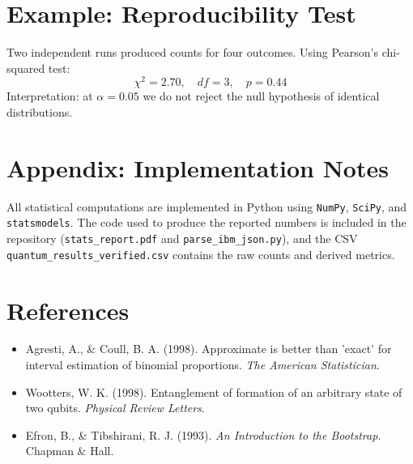 \documentclass[11pt]{article}
\begin{document}
\section{Example: Reproducibility Test}
Two independent runs produced counts for four outcomes. Using Pearson's chi-squared test:
\[
\chi^2 = 2.70,\quad df=3,\quad p=0.44
\]
Interpretation: at $\alpha=0.05$ we do not reject the null hypothesis of identical distributions.

\section{Appendix: Implementation Notes}
All statistical computations are implemented in Python using \texttt{NumPy}, \texttt{SciPy}, and \texttt{statsmodels}. The code used to produce the reported numbers is included in the repository (\texttt{stats\_report.pdf} and \texttt{parse\_ibm\_json.py}), and the CSV \texttt{quantum\_results\_verified.csv} contains the raw counts and derived metrics.

\section*{References}
\begin{itemize}
  \item Agresti, A., \& Coull, B. A. (1998). Approximate is better than 'exact' for interval estimation of binomial proportions. \emph{The American Statistician}.
  \item Wootters, W. K. (1998). Entanglement of formation of an arbitrary state of two qubits. \emph{Physical Review Letters}.
  \item Efron, B., \& Tibshirani, R. J. (1993). \emph{An Introduction to the Bootstrap}. Chapman \& Hall.
\end{itemize}
\end{document}
